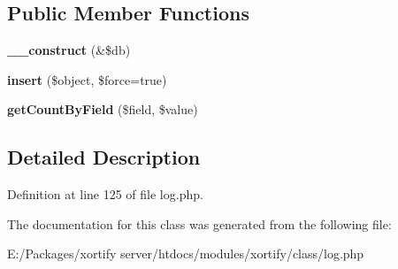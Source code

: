 \subsection*{Public Member Functions}
\begin{DoxyCompactItemize}
\item 
\hypertarget{class_xortify_log_handler_aaf2ef772755ec6f361d44e16cc9ffd69}{{\bfseries \-\_\-\-\_\-construct} (\&\$db)}\label{class_xortify_log_handler_aaf2ef772755ec6f361d44e16cc9ffd69}

\item 
\hypertarget{class_xortify_log_handler_a43ce63406579e889066e8a073ff2ccf9}{{\bfseries insert} (\$object, \$force=true)}\label{class_xortify_log_handler_a43ce63406579e889066e8a073ff2ccf9}

\item 
\hypertarget{class_xortify_log_handler_a9438af458937a969601359ed9db48792}{{\bfseries get\-Count\-By\-Field} (\$field, \$value)}\label{class_xortify_log_handler_a9438af458937a969601359ed9db48792}

\end{DoxyCompactItemize}


\subsection{Detailed Description}


Definition at line 125 of file log.\-php.



The documentation for this class was generated from the following file\-:\begin{DoxyCompactItemize}
\item 
E\-:/\-Packages/xortify server/htdocs/modules/xortify/class/log.\-php\end{DoxyCompactItemize}
